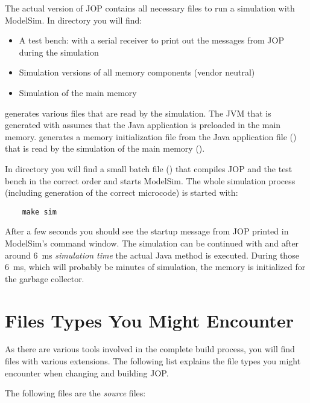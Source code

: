 The actual version of JOP contains all necessary files to run a
simulation with ModelSim. In directory  you
will find:
%
\begin{itemize}
    \item A test bench:  with a serial receiver to
    print out the messages from JOP during the simulation
    \item Simulation versions of all memory components (vendor neutral)
    \item Simulation of the main memory
\end{itemize}
%
 generates various  files that are read
by the simulation. The JVM that is generated with 
assumes that the Java application is preloaded in the main memory.
 generates a memory initialization file from the Java
application file () that is read by the
simulation of the main memory ().

In directory  you will find a small batch file
() that compiles JOP and the test bench in the correct
order and starts ModelSim. The whole simulation process (including
generation of the correct microcode) is started with:

\begin{verbatim}
    make sim
\end{verbatim}

After a few seconds you should see the startup message from JOP
printed in ModelSim's command window. The simulation can be continued
with  and after around 6~ms \emph{simulation time} the
actual Java  method is executed. During those 6~ms,
which will probably be minutes of simulation, the memory is
initialized for the garbage collector.

\section{Files Types You Might Encounter}

As there are various tools involved in the complete build process,
you will find files with various extensions. The following list
explains the file types you might encounter when changing and
building JOP.

The following files are the \emph{source} files:

